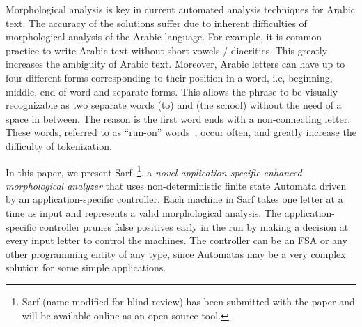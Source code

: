 \documentclass[11pt]{article}
\newcommand{\noTrRL}[1]{\transfalse\RL{#1}\transtrue}
\newcommand{\noTrnoVocRL}[1]{\transfalse\novocalize\noTrRL{#1}\vocalize\transtrue}
\newcommand{\noVocRL}[1]{\transtrue\novocalize\RL{#1}\vocalize}
\begin{document}
Morphological analysis is key in current automated 
analysis techniques for Arabic text. 
%
The accuracy of the solutions suffer due to inherent difficulties
of morphological analysis of the Arabic language. 
For example, it is common practice to write Arabic text
without short vowels / diacritics. 
This greatly increases the ambiguity of Arabic text.
Moreover, Arabic letters can have up to 
four different forms
corresponding to their position in a word, i.e, beginning,
middle, end of word and separate forms. 
This allows the phrase 
\noTrnoVocRL{il_A\nospace almdrsT}
to be visually recognizable
as two separate words \noVocRL{il_A} (to) and \noVocRL{almdrsT} (the school) 
without the need of a space in between. 
The reason is the first word \noVocRL{il_A} ends with
\noVocRL{_A} a non-connecting letter. 
These words,
referred to as ``run-on'' words~\cite{Buckwalter:04},
occur often, and greatly increase the
difficulty of tokenization.

In this paper, we present Sarf~\footnote{Sarf (name modified for blind review) 
has been submitted with the paper and will be available online as an open source tool.},
 a {\em novel application-specific %
enhanced %
morphological analyzer} that uses 
non-deterministic finite state Automata 
driven by an application-specific controller.
Each machine in Sarf takes one letter at a time as input
and represents a valid morphological analysis.
The application-specific controller prunes false positives
early in the run by making a decision at every input letter
to control the machines.
The controller can be an FSA or any other %
programming entity of any type,
since Automatas may be a very complex solution for some simple applications.
\end{document}
